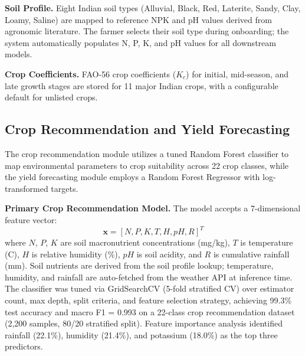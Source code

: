 \documentclass[conference]{IEEEtran}
\begin{document}
\textbf{Soil Profile.} Eight Indian soil types (Alluvial, Black, Red, Laterite, Sandy, Clay, Loamy, Saline) are mapped to reference NPK and pH values derived from agronomic literature. The farmer selects their soil type during onboarding; the system automatically populates N, P, K, and pH values for all downstream models.

\textbf{Crop Coefficients.} FAO-56 crop coefficients ($K_c$) for initial, mid-season, and late growth stages are stored for 11 major Indian crops, with a configurable default for unlisted crops.

\subsection{Crop Recommendation and Yield Forecasting}

The crop recommendation module utilizes a tuned Random Forest classifier to map environmental parameters to crop suitability across 22 crop classes, while the yield forecasting module employs a Random Forest Regressor with log-transformed targets.

\textbf{Primary Crop Recommendation Model.} The model accepts a 7-dimensional feature vector:
\begin{equation}
\mathbf{x} = [N, P, K, T, H, pH, R]^T
\label{eq:crop_features}
\end{equation}
where $N$, $P$, $K$ are soil macronutrient concentrations (mg/kg), $T$ is temperature (\textdegree C), $H$ is relative humidity (\%), $pH$ is soil acidity, and $R$ is cumulative rainfall (mm). Soil nutrients are derived from the soil profile lookup; temperature, humidity, and rainfall are auto-fetched from the weather API at inference time. The classifier was tuned via GridSearchCV (5-fold stratified CV) over estimator count, max depth, split criteria, and feature selection strategy, achieving 99.3\% test accuracy and macro F1 = 0.993 on a 22-class crop recommendation dataset (2,200 samples, 80/20 stratified split). Feature importance analysis identified rainfall (22.1\%), humidity (21.4\%), and potassium (18.0\%) as the top three predictors.
\end{document}
